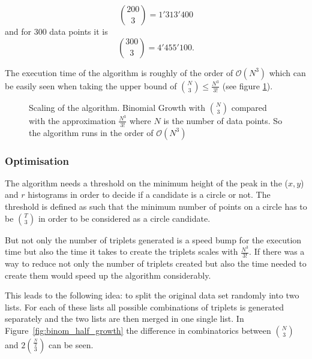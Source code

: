 \documentclass[11pt,twoside]{scrreprt}
\begin{document}
\[ \binom{200}{3} = 1'313'400 \]
and for 300 data points it is
\[ \binom{300}{3} = 4'455'100. \]

The execution time of the algorithm is roughly of the order of $\mathcal{O}(N^3)$ which can be easily seen when taking the upper bound of $\binom{N}{3} \leq \frac{N^3}{3!}$ (see figure \ref{fig:binom_growth}). 
\begin{figure}[ht]
\centering
    \caption[Complexity of the combinatorial triplet Hough transform]{Scaling of the algorithm. Binomial Growth with $\binom{N}{3}$ compared with the approximation $\frac{N^3}{3!}$ where $N$ is the number of data points. So the algorithm runs in the order of $\mathcal{O}(N^3)$}
  \label{fig:binom_growth}
\end{figure}


\subsubsection{Optimisation} %
\label{ssub:improvement_of_speed}

The algorithm needs a threshold on the minimum height of the peak in the ($x,y$) and $r$ histograms in order to decide if a candidate is a circle or not. The threshold is defined as such that the minimum number of points on a circle has to be $\binom{T}{3}$ in order to be considered as a circle candidate. 

But not only the number of triplets generated is a speed bump for the execution time but also the time it takes to create the triplets scales with $\frac{N^3}{3!}$. If there was a way to reduce not only the number of triplets created but also the time needed to create them would speed up the algorithm considerably.

This leads to the following idea: to split the original data set randomly into two lists. For each of these lists all possible combinations 
of triplets is generated separately and the two lists are then merged in one single list. In Figure~\ref{fig:binom_half_growth} 
the difference in combinatorics between $\binom{N}{3}$ and $2\binom{\frac{N}{2}}{3}$ can be seen.
\end{document}
